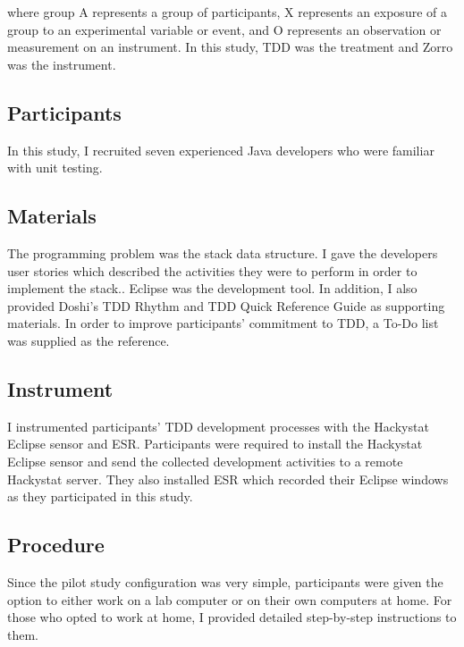 where group A represents a group of participants, X represents an exposure of a group to an experimental variable or event, and O represents an observation or measurement on an instrument. In this study, TDD was the treatment and Zorro was the instrument.  

\subsection{Participants}

In this study, I recruited seven experienced Java developers who were 
familiar with unit testing. 

\subsection{Materials}
The programming problem was the stack data structure. I gave the developers user stories which described the activities they were to perform in order to implement the stack.. Eclipse was the development tool. In addition, I also provided Doshi's TDD Rhythm \cite{TDDRhythm} and TDD Quick Reference Guide \cite{TDDQuickReference} as supporting materials. In order to improve participants' commitment to TDD, a To-Do list was supplied as the reference. 

\subsection{Instrument}
I instrumented participants' TDD development processes with the Hackystat Eclipse sensor and ESR. Participants were required to install the Hackystat Eclipse sensor and send the collected development activities to a remote Hackystat server. They also installed ESR which recorded their Eclipse windows as they participated in this study. 

\subsection{Procedure}
Since the pilot study configuration was very simple, participants were given the option to either work on a lab computer or on their own computers at home. For those who opted to work at home, I provided detailed step-by-step instructions to them.  

